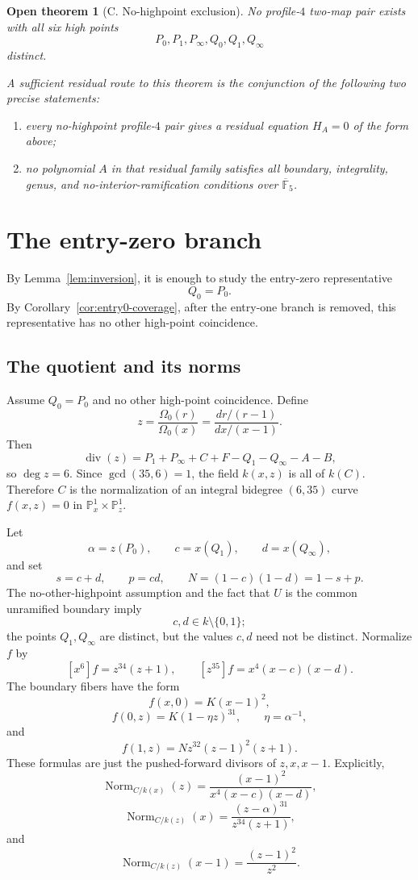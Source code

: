 \documentclass[11pt]{amsart}
\newtheorem{opentheorem}[theorem]{Open theorem}
\newcommand{\kbar}{\overline{\mathbb F}_5}
\newcommand{\PP}{\mathbb P}
\newcommand{\Div}{\operatorname{div}}
\newcommand{\Norm}{\operatorname{Norm}}
\begin{document}
\begin{opentheorem}[C. No-highpoint exclusion]
\label{open:no-highpoint}
No profile-\(4\) two-map pair exists with all six high points
\[
  P_0,P_1,P_\infty,Q_0,Q_1,Q_\infty
\]
distinct.

A sufficient residual route to this theorem is the conjunction of the
following two precise statements:
\begin{enumerate}[label=\textnormal{(\arabic*)},leftmargin=2.2em]
\item every no-highpoint profile-\(4\) pair gives a residual equation
  \(H_A=0\) of the form above;
\item no polynomial \(A\) in that residual family satisfies all boundary,
  integrality, genus, and no-interior-ramification conditions over \(\kbar\).
\end{enumerate}
\end{opentheorem}

\section{The entry-zero branch}
\label{sec:entry-zero}

By Lemma~\ref{lem:inversion}, it is enough to study the entry-zero
representative
\[
  Q_0=P_0.
\]
By Corollary~\ref{cor:entry0-coverage}, after the entry-one branch is removed,
this representative has no other high-point coincidence.

\subsection{The quotient and its norms}

Assume \(Q_0=P_0\) and no other high-point coincidence.  Define
\[
  z=\frac{\Omega_0(r)}{\Omega_0(x)}
   =\frac{dr/(r-1)}{dx/(x-1)}.
\]
Then
\[
  \Div(z)=P_1+P_\infty+C+F-Q_1-Q_\infty-A-B,
\]
so \(\deg z=6\).  Since \(\gcd(35,6)=1\), the field \(k(x,z)\) is all of
\(k(C)\).  Therefore \(C\) is the normalization of an integral bidegree
\((6,35)\) curve \(f(x,z)=0\) in \(\PP^1_x\times\PP^1_z\).

Let
\[
  \alpha=z(P_0),\qquad c=x(Q_1),\qquad d=x(Q_\infty),
\]
and set
\[
  s=c+d,\qquad p=cd,\qquad N=(1-c)(1-d)=1-s+p.
\]
The no-other-highpoint assumption and the fact that \(U\) is the common
unramified boundary imply
\[
  c,d\in k\setminus\{0,1\};
\]
the points \(Q_1,Q_\infty\) are distinct, but the values \(c,d\) need not be
distinct.
Normalize \(f\) by
\[
  [x^6]f=z^{34}(z+1),\qquad [z^{35}]f=x^4(x-c)(x-d).
\]
The boundary fibers have the form
\[
  f(x,0)=K(x-1)^2,
\]
\[
  f(0,z)=K(1-\eta z)^{31},\qquad \eta=\alpha^{-1},
\]
and
\[
  f(1,z)=N z^{32}(z-1)^2(z+1).
\]
These formulas are just the pushed-forward divisors of \(z,x,x-1\).  Explicitly,
\[
  \Norm_{C/k(x)}(z)=
  \frac{(x-1)^2}{x^4(x-c)(x-d)},
\]
\[
  \Norm_{C/k(z)}(x)=
  \frac{(z-\alpha)^{31}}{z^{34}(z+1)},
\]
and
\[
  \Norm_{C/k(z)}(x-1)=\frac{(z-1)^2}{z^2}.
\]
\end{document}
